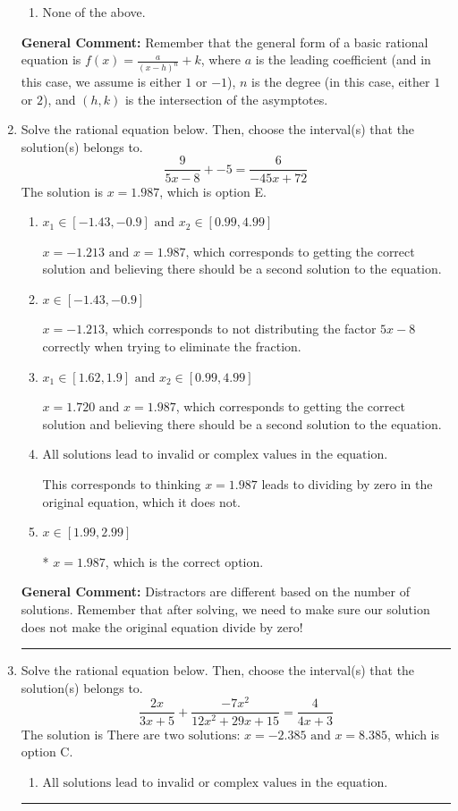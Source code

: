 \documentclass{extbook}[14pt]
\newcommand{\litem}[1]{\item #1

\rule{\textwidth}{0.4pt}}
\begin{document}
\begin{enumerate}
{\begin{enumerate}[label=\Alph*.]
\begin{multicols}{2}
\end{multicols}\item None of the above.\end{enumerate}
\textbf{General Comment:} Remember that the general form of a basic rational equation is $ f(x) = \frac{a}{(x-h)^n} + k$, where $a$ is the leading coefficient (and in this case, we assume is either $1$ or $-1$), $n$ is the degree (in this case, either $1$ or $2$), and $(h, k)$ is the intersection of the asymptotes.
}
\litem{
Solve the rational equation below. Then, choose the interval(s) that the solution(s) belongs to.
\[ \frac{9}{5x -8} + -5 = \frac{6}{-45x + 72} \]
The solution is \( x = 1.987 \), which is option E.\begin{enumerate}[label=\Alph*.]
\item \( x_1 \in [-1.43, -0.9] \text{ and } x_2 \in [0.99,4.99] \)

$x = -1.213 \text{ and } x = 1.987$, which corresponds to getting the correct solution and believing there should be a second solution to the equation.
\item \( x \in [-1.43,-0.9] \)

$x = -1.213$, which corresponds to not distributing the factor $5x -8$ correctly when trying to eliminate the fraction.
\item \( x_1 \in [1.62, 1.9] \text{ and } x_2 \in [0.99,4.99] \)

$x = 1.720 \text{ and } x = 1.987$, which corresponds to getting the correct solution and believing there should be a second solution to the equation.
\item \( \text{All solutions lead to invalid or complex values in the equation.} \)

This corresponds to thinking $x = 1.987$ leads to dividing by zero in the original equation, which it does not.
\item \( x \in [1.99,2.99] \)

* $x = 1.987$, which is the correct option.
\end{enumerate}

\textbf{General Comment:} Distractors are different based on the number of solutions. Remember that after solving, we need to make sure our solution does not make the original equation divide by zero!
}
\litem{
Solve the rational equation below. Then, choose the interval(s) that the solution(s) belongs to.
\[ \frac{2x}{3x + 5} + \frac{-7x^{2}}{12x^{2} +29 x + 15} = \frac{4}{4x + 3} \]
The solution is \( \text{There are two solutions: } x = -2.385 \text{ and } x = 8.385 \), which is option C.\begin{enumerate}[label=\Alph*.]
\item \( \text{All solutions lead to invalid or complex values in the equation.} \)



\end{enumerate}}
\end{enumerate}
\end{document}
